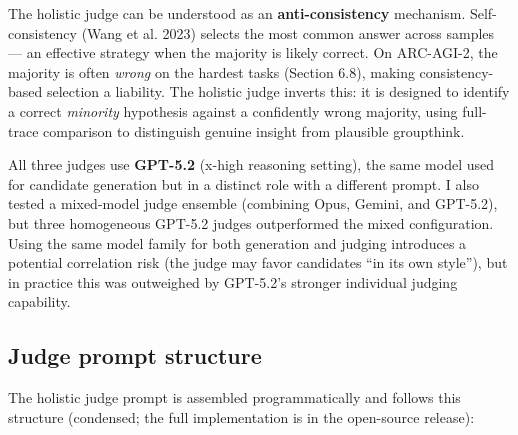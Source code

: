 \documentclass[11pt]{article}
\begin{document}
The holistic judge can be understood as an \textbf{anti-consistency}
mechanism. Self-consistency (Wang et al. 2023) selects the most common
answer across samples --- an effective strategy when the majority is
likely correct. On ARC-AGI-2, the majority is often \emph{wrong} on the
hardest tasks (Section 6.8), making consistency-based selection a
liability. The holistic judge inverts this: it is designed to identify a
correct \emph{minority} hypothesis against a confidently wrong majority,
using full-trace comparison to distinguish genuine insight from
plausible groupthink.

All three judges use \textbf{GPT-5.2} (x-high reasoning setting), the
same model used for candidate generation but in a distinct role with a
different prompt. I also tested a mixed-model judge ensemble (combining
Opus, Gemini, and GPT-5.2), but three homogeneous GPT-5.2 judges
outperformed the mixed configuration. Using the same model family for
both generation and judging introduces a potential correlation risk (the
judge may favor candidates ``in its own style''), but in practice this
was outweighed by GPT-5.2's stronger individual judging capability.

\hypertarget{judge-prompt-structure}{%
\subsection{Judge prompt structure}\label{judge-prompt-structure}}

The holistic judge prompt is assembled programmatically and follows this
structure (condensed; the full implementation is in the open-source
release):
\end{document}
